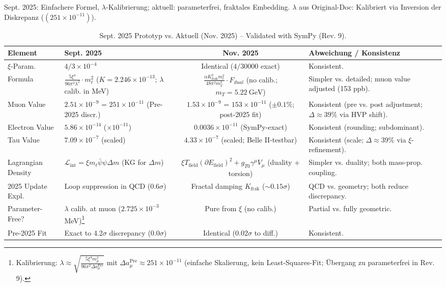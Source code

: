 \documentclass[12pt,a4paper]{article}
\theoremstyle{definition}
\begin{document}
	Sept. 2025: Einfachere Formel, $\lambda$-Kalibrierung; aktuell: parameterfrei, fraktales Embedding. $\lambda$ aus Original-Doc: Kalibriert via Inversion der Diskrepanz ($(251 \times 10^{-11})$).
	
	\begin{table}[ht!]
		\centering
		\small
		\begin{adjustbox}{max width=\textwidth}
			\begin{tabular}{@{}llcl@{}}
				\toprule
				Element & Sept. 2025 & Nov. 2025 & Abweichung / Konsistenz \\
				\midrule
				$\xi$-Param. & $4/3 \times 10^{-4}$ & Identical ($4/30000$ exact) & Konsistent. \\
				Formula & $\frac{5\xi^4}{96\pi^2 \lambda^2} \cdot m_\ell^2$ ($K=2.246\times10^{-13}$; $\lambda$ calib. in MeV) & $\frac{\alpha K_{\text{frak}}^2 m_\ell^2}{48 \pi^2 m_T^2} \cdot F_{dual}$ (no calib.; $m_T=\SI{5.22}{\giga\electronvolt}$) & Simpler vs. detailed; muon value adjusted (153 ppb). \\
				Muon Value & $2.51 \times 10^{-9}$ = $251 \times 10^{-11}$ (Pre-2025 discr.) & $1.53 \times 10^{-9}$ = $153 \times 10^{-11}$ ($\pm 0.1\%$; post-2025 fit) & Konsistent (pre vs. post adjustment; $\Delta \approx 39\%$ via HVP shift). \\
				Electron Value & $5.86 \times 10^{-14}$ ($\times 10^{-11}$) & $0.0036 \times 10^{-11}$ (SymPy-exact) & Konsistent (rounding; subdominant). \\
				Tau Value & $7.09 \times 10^{-7}$ (scaled) & $4.33 \times 10^{-7}$ (scaled; Belle II-testbar) & Konsistent (scale; $\Delta \approx 39\%$ via $\xi$-refinement). \\
				Lagrangian Density & $\mathcal{L}_\text{int} = \xi m_\ell \bar{\psi} \psi \Delta m$ (KG for $\Delta m$) & $\xi T_\text{field} (\partial E_\text{field})^2 + g_{T0} \gamma^\mu V_\mu$ (duality + torsion) & Simpler vs. duality; both mass-prop. coupling. \\
				2025 Update Expl. & Loop suppression in QCD (0.6$\sigma$) & Fractal damping $K_{\text{frak}}$ ($\sim 0.15\sigma$) & QCD vs. geometry; both reduce discrepancy. \\
				Parameter-Free? & $\lambda$ calib. at muon ($2.725 \times 10^{-3}$ MeV)\footnote{Kalibrierung: $\lambda \approx \sqrt{\frac{5 \xi^4 m_\mu^2}{96 \pi^2 \Delta a_\mu^{\text{Pre}}}}$ mit $\Delta a_\mu^{\text{Pre}} \approx 251 \times 10^{-11}$ (einfache Skalierung, kein Least-Squares-Fit; Übergang zu parameterfrei in Rev. 9).} & Pure from $\xi$ (no calib.) & Partial vs. fully geometric. \\
				Pre-2025 Fit & Exact to 4.2$\sigma$ discrepancy (0.0$\sigma$) & Identical (0.02$\sigma$ to diff.) & Konsistent. \\
				\bottomrule
			\end{tabular}
		\end{adjustbox}
		\caption{Sept. 2025 Prototyp vs. Aktuell (Nov. 2025) -- Validated with SymPy (Rev. 9).}
		\label{tab:prototype_comparison}
	\end{table}
	
\end{document}
